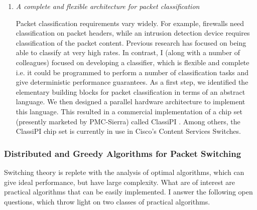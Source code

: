 \documentclass[11pt, a4paper]{article}
\begin{document}
\begin{small}
\begin{enumerate}
\item {\em A complete and flexible architecture for packet classification}



Packet classification requirements vary widely.
For example, firewalls need classification on packet headers, while an
intrusion detection device requires classification of the packet content. 
Previous research has focused on being able to classify at very
high rates. In contrast, I (along with a number of colleagues) 
focused on developing a classifier, which is flexible and complete i.e. it could be programmed to
perform a number of classification tasks and give deterministic performance guarantees.
As a first step, we identified the elementary building blocks for packet
classification in terms of an abstract language. We then designed a parallel hardware architecture
to implement this 
language. This resulted in a commercial implementation of a chip set
(presently marketed by PMC-Sierra) called ClassiPI \cite{classipi}.
Among others, the ClassiPI chip set is currently in use in Cisco's
Content Services Switches.


\end{enumerate}

\subsubsection*{\small Distributed and Greedy Algorithms for Packet Switching}


Switching theory is replete with the analysis of optimal algorithms, which can give 
ideal performance, but have large complexity. What are of interest are practical algorithms that can 
be easily implemented. I answer the following open questions, which throw light on two classes of 
practical algorithms.


\end{small}
\end{document}
